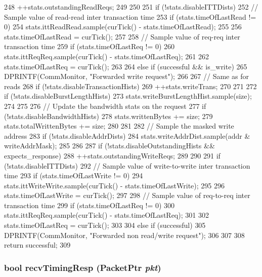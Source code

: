 \begin{DoxyCode}
{{{248             ++stats.outstandingReadReqs;
249         }
250 
251         if (!stats.disableITTDists) {
252             // Sample value of read-read inter transaction time
253             if (stats.timeOfLastRead != 0) {
254                 stats.ittReadRead.sample(curTick() - stats.timeOfLastRead);
255             }
256             stats.timeOfLastRead = curTick();
257 
258             // Sample value of req-req inter transaction time
259             if (stats.timeOfLastReq != 0) {
260                 stats.ittReqReq.sample(curTick() - stats.timeOfLastReq);
261             }
262             stats.timeOfLastReq = curTick();
263         }
264     } else if (successful && is_write) {
265         DPRINTF(CommMonitor, "Forwarded write request\n");
266 
267         // Same as for reads
268         if (!stats.disableTransactionHists) {
269             ++stats.writeTrans;
270         }
271 
272         if (!stats.disableBurstLengthHists) {
273             stats.writeBurstLengthHist.sample(size);
274         }
275 
276         // Update the bandwidth stats on the request
277         if (!stats.disableBandwidthHists) {
278             stats.writtenBytes += size;
279             stats.totalWrittenBytes += size;
280         }
281 
282         // Sample the masked write address
283         if (!stats.disableAddrDists) {
284             stats.writeAddrDist.sample(addr & writeAddrMask);
285         }
286 
287         if (!stats.disableOutstandingHists && expects_response) {
288             ++stats.outstandingWriteReqs;
289         }
290 
291         if (!stats.disableITTDists) {
292             // Sample value of write-to-write inter transaction time
293             if (stats.timeOfLastWrite != 0) {
294                 stats.ittWriteWrite.sample(curTick() - stats.timeOfLastWrite);
295             }
296             stats.timeOfLastWrite = curTick();
297 
298             // Sample value of req-to-req inter transaction time
299             if (stats.timeOfLastReq != 0) {
300                 stats.ittReqReq.sample(curTick() - stats.timeOfLastReq);
301             }
302             stats.timeOfLastReq = curTick();
303         }
304     } else if (successful) {
305         DPRINTF(CommMonitor, "Forwarded non read/write request\n");
306     }
307 
308     return successful;
309 }
\end{DoxyCode}
\hypertarget{classCommMonitor_a482dba5588f4bee43e498875a61e5e0b}{
\subsubsection[{recvTimingResp}]{\setlength{\rightskip}{0pt plus 5cm}bool recvTimingResp ({\bf PacketPtr} {\em pkt})}}
\label{classCommMonitor_a482dba5588f4bee43e498875a61e5e0b}



